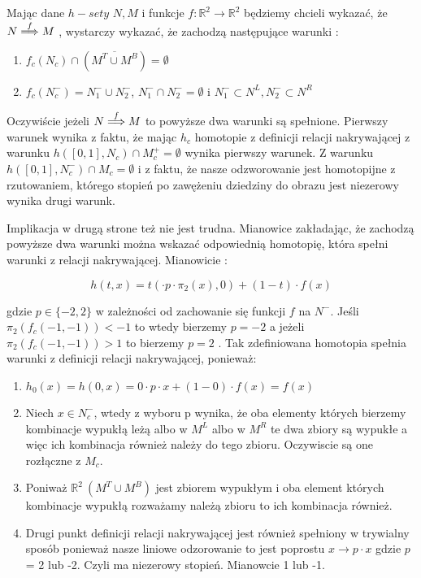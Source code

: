 Mając dane $ h-sety $ $ N,M $ i funkcje $ f : \mathbb R^2 \to \mathbb R^2 $ będziemy chcieli wykazać, że  $N \stackrel{f}{\Longrightarrow} M$ , wystarczy 
wykazać, że zachodzą następujące warunki :
\begin{enumerate}
 \item $ f_c(N_c) \cap ( \overline{M^T \cup M^B} ) = \emptyset $
 \item $ f_c(N^-_c) = N^{-}_1 \cup N^{-}_2 $, $ N^{-}_1 \cap N^{-}_2 = \emptyset $ i $ N^-_1 \subset N^L , N^-_2 \subset N^R $ 
\end{enumerate}

Oczywiście jeżeli $ N \stackrel{f}{\Longrightarrow} M $ to powyższe dwa warunki są spełnione.
Pierwszy warunek wynika z faktu, że mając $h_c $ homotopie z definicji relacji nakrywającej z warunku 
$ h([0,1],N_c) \cap M^+_c = \emptyset $ wynika pierwszy warunek. Z warunku $ h([0,1],N^-_c) \cap M_c = \emptyset $ i z faktu, że nasze 
odzworowanie jest homotopijne z rzutowaniem, którego stopień po zawężeniu dziedziny do obrazu jest niezerowy wynika drugi warunk.

Implikacja w drugą strone też nie jest trudna. Mianowice zakładając, że zachodzą powyższe dwa warunki można wskazać odpowiednią homotopię,
która spełni warunki z relacji nakrywającej.
Mianowicie :

$$
  h(t,x) = t( \cdot p \cdot \pi_2(x),0) + (1-t)\cdot f(x)
$$

gdzie $ p \in \{-2,2\} $ w zależności od zachowanie się funkcji $ f $ na $ N^-$. Jeśli $ \pi_2(f_c( -1,-1)) < -1 $ to wtedy bierzemy $ p = -2 $ 
a jeżeli $ \pi_2(f_c( -1,-1)) > 1 $  to bierzemy $ p = 2 $ . 
Tak zdefiniowana homotopia spełnia warunki z definicji relacji nakrywającej, ponieważ:
\begin{enumerate}
 \item $ h_0(x) = h(0,x) = 0 \cdot p \cdot x + (1-0) \cdot f(x) = f(x) $
 \item Niech $ x \in N^-_c $, wtedy z wyboru p wynika, że oba elementy których bierzemy kombinacje wypukłą leżą albo w $ M^L $ albo w $ M^R$ 
 te dwa zbiory są wypukłe a więc ich kombinacja również należy do tego zbioru. Oczywiscie są one rozłączne z $ M_c$.
 \item Poniważ $ \mathbb R^2 \ (M^T \cup M^B) $ jest zbiorem wypukłym i oba element których kombinacje wypukłą rozważamy należą 
 zbioru to ich kombinacja również.
 \item Drugi punkt definicji relacji nakrywającej jest również spełniony w trywialny sposób ponieważ nasze liniowe odzorowanie to jest poprostu
 $ x \to p \cdot x $ gdzie $ p $ = 2 lub -2. Czyli ma niezerowy stopień. Mianowcie 1 lub -1.
\end{enumerate}

